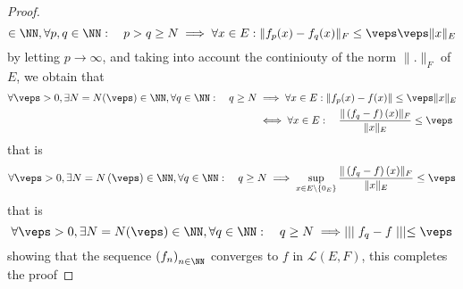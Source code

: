 \begin{proof}
\[		\in \NN, 
		\forall p,q \in \NN: \quad 
		p > q \geq N \implies 
		\forall  x \in E : 
		\| f_{p}(x) - f_{q}(x)   \|  _{F} \leq 
		\veps  \veps  \| x \|_{E}
		\]
		by letting $p \rightarrow \infty $, and taking into account
		the continiouty of the norm $\| . \| _{F}$  of $E$, we obtain that
		\begin{align*}
		\forall \veps  > 0, \exists N = N(\veps )  \in \NN, 
		\forall q \in \NN: \quad  
		q \geq N &\implies 
		\forall x \in E : 
		\| f_{p}(x) - f(x)   \|  \leq 
		\veps  \| x \| _{E} \\
		& \iff \forall  x \in E : 
		\quad \frac{\| \left( f_{q}-f \right)(x)  \| _{F}}{ \| x \| _{E}} 
		\leq  \veps 
		\end{align*}
		that is 
		\[
		\forall  \veps  > 0, \exists  N = N \left( \veps  \right) \in \NN, 
		\forall  q \in  \NN : \quad 
		q \geq N \implies 
		\sup_{x \in E \backslash \left\{ 0_{E} \right\}}  
		\frac{\| \left( f_{q}-f \right)(x)  \|_{F} }{
			\| x \|_{E}
		} \leq \veps 
		\]
		that is 
		\[
		\forall  \veps  > 0, \exists N = N(\veps )  \in \NN, 
		\forall q \in \NN : 
		\quad q \geq N \implies 
		\mid \mid \mid  f_{q} - f \mid \mid \mid  \leq \veps 
		\]
		showing that the sequence 
		$\left( f_{n} \right)_{n \in \NN}$  
		converges to $f$ in $\mathcal{L} \left( E,F \right)$, this completes
		the proof
\end{proof}
% 
